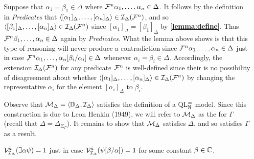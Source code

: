 Suppose that $\alpha_1=\beta_1\in\Delta$ where $\mathcal{F}^n\alpha_1,\ldots,\alpha_n\in\Delta$. 
It follows by the definition in \textit{Predicates} that $\langle[\alpha_1]_\Delta,\ldots,[\alpha_n]_\Delta\rangle\in\mathcal{I}_\Delta(\mathcal{F}^n)$, and so $\langle[\beta_1]_\Delta,\ldots,[\alpha_n]_\Delta\rangle\in\mathcal{I}_\Delta(\mathcal{F}^n)$ since $[\alpha_1]_\Delta=[\beta_1]_\Delta$ by \textbf{\ref{lemma:define}}.
Thus $\mathcal{F}^n\beta_1,\ldots,\alpha_n\in\Delta$ again by \textit{Predicates}. 
What the lemma above shows is that this type of reasoning will never produce a contradiction since $\mathcal{F}^n\alpha_1,\ldots,\alpha_n\in\Delta$ just in case $\mathcal{F}^n\alpha_1,\ldots,\alpha_n[\beta_i/\alpha_i]\in\Delta$ whenever $\alpha_i=\beta_i\in\Delta$. 
Accordingly, the extension $\mathcal{I}_\Delta(\mathcal{F}^n)$ for any predicate $\mathcal{F}^n$ is well-defined since their is no possibility of disagreement about whether $\langle[\alpha_1]_\Delta,\ldots,[\alpha_n]_\Delta\rangle\in\mathcal{I}_\Delta(\mathcal{F}^n)$ by changing the representative $\alpha_i$ for the element $[\alpha_i]_\Delta$ to $\beta_i$.

Observe that $\mathcal{M}_\Delta=\langle\mathbb{D}_\Delta,\mathcal{I}_\Delta\rangle$ satisfies the definition of a QL$^=_{\mathbb{N}}$ model.
Since this construction is due to Leon Henkin (1949), we will refer to $\mathcal{M}_\Delta$ as the  for $\Gamma$ (recall that $\Delta=\Delta_{\Sigma_\Gamma}$).
It remains to show that $\mathcal{M}_\Delta$ satisfies $\Delta$, and so satisfies $\Gamma$ as a result.





\begin{Lthm} \label{lemma:quantE}
  $\mathcal{V}_{\mathcal{I}_\Delta}^{\hat{a}}(\exists \alpha\psi)=1$ just in case $\mathcal{V}_{\mathcal{I}_\Delta}^{\hat{a}}(\psi[\beta/\alpha])=1$ for some constant $\beta\in\mathbb{C}$.
\end{Lthm}


